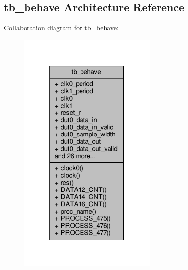 \subsection{tb\+\_\+behave Architecture Reference}
\label{classbit__unpack__64__tb_1_1tb__behave}


Collaboration diagram for tb\+\_\+behave\+:\nopagebreak
\begin{figure}[H]
\begin{center}
\leavevmode
\includegraphics[width=193pt]{df/d00/classbit__unpack__64__tb_1_1tb__behave__coll__graph}
\end{center}
\end{figure}
